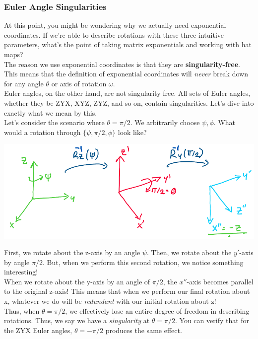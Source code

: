 \documentclass[oneside]{book}
\begin{document}
\subsubsection{Euler Angle Singularities}
At this point, you might be wondering why we actually need exponential coordinates. If we're able to describe rotations with these three intuitive parameters, what's the point of taking matrix exponentials and working with hat maps?\\
The reason we use exponential coordinates is that they are \textbf{singularity-free}. This means that the definition of exponential coordinates will \textit{never} break down for any angle $\theta$ or axis of rotation $\omega$.\\
Euler angles, on the other hand, are not singularity free. All sets of Euler angles, whether they be ZYX, XYZ, ZYZ, and so on, contain singularities. Let's dive into exactly what we mean by this.\\
Let's consider the scenario where $\theta = \pi/2$. We arbitrarily choose $\psi, \phi$. What would a rotation through $\{\psi, \pi/2, \phi\}$ look like?
\begin{center}
    \includegraphics[scale=0.3]{images/singularity.png}
\end{center}
First, we rotate about the z-axis by an angle $\psi$. Then, we rotate about the $y'$-axis by angle $\pi/2$. But, when we perform this second rotation, we notice something interesting!\\
When we rotate about the y-axis by an angle of $\pi/2$, the $x''$-axis becomes parallel to the original z-axis! This means that when we perform our final rotation about x, whatever we do will be \textit{redundant} with our initial rotation about z!\\
Thus, when $\theta = \pi/2$, we effectively lose an entire degree of freedom in describing rotations. Thus, we say we have a \textit{singularity} at $\theta = \pi/2$. You can verify that for the ZYX Euler angles, $\theta = -\pi/2$ produces the same effect.\\
\end{document}

